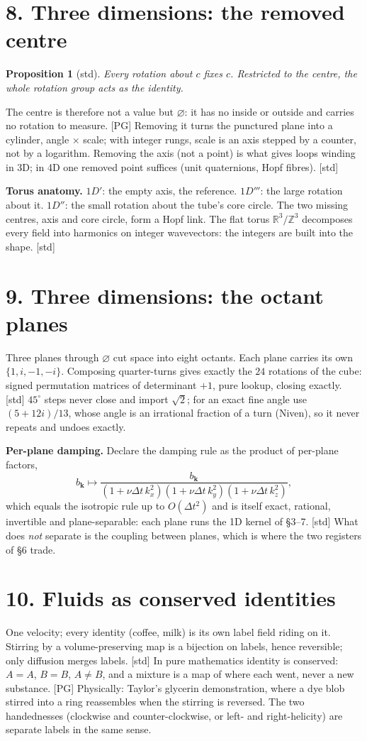\documentclass[11pt,a4paper]{article}
\newtheorem{prop}{Proposition}
\newcommand{\stamp}[1]{\textsf{\small[#1]}}
\newcommand{\E}{\varnothing}
\begin{document}
\section*{8. Three dimensions: the removed centre}
\begin{prop}[std]
Every rotation about $c$ fixes $c$. Restricted to the centre, the whole rotation group acts as the identity.
\end{prop}
The centre is therefore not a value but $\E$: it has no inside or outside and carries no rotation to measure. \stamp{PG} Removing it turns the punctured plane into a cylinder, angle $\times$ scale; with integer rungs, scale is an axis stepped by a counter, not by a logarithm. Removing the axis (not a point) is what gives loops winding in 3D; in 4D one removed point suffices (unit quaternions, Hopf fibres). \stamp{std}

\textbf{Torus anatomy.} $1D'$: the empty axis, the reference. $1D'''$: the large rotation about it. $1D''$: the small rotation about the tube's core circle. The two missing centres, axis and core circle, form a Hopf link. The flat torus $\mathbb R^3/\mathbb Z^3$ decomposes every field into harmonics on integer wavevectors: the integers are built into the shape. \stamp{std}

\section*{9. Three dimensions: the octant planes}
Three planes through $\E$ cut space into eight octants. Each plane carries its own $\{1,i,-1,-i\}$. Composing quarter-turns gives exactly the $24$ rotations of the cube: signed permutation matrices of determinant $+1$, pure lookup, closing exactly. \stamp{std} $45^\circ$ steps never close and import $\sqrt2$; for an exact fine angle use $(5+12i)/13$, whose angle is an irrational fraction of a turn (Niven), so it never repeats and undoes exactly.

\textbf{Per-plane damping.} Declare the damping rule as the product of per-plane factors,
\[
b_{\mathbf k}\mapsto\frac{b_{\mathbf k}}{(1+\nu\Delta t\,k_x^2)(1+\nu\Delta t\,k_y^2)(1+\nu\Delta t\,k_z^2)},
\]
which equals the isotropic rule up to $O(\Delta t^2)$ and is itself exact, rational, invertible and plane-separable: each plane runs the 1D kernel of \S3--7. \stamp{std} What does \emph{not} separate is the coupling between planes, which is where the two registers of \S6 trade.

\section*{10. Fluids as conserved identities}
One velocity; every identity (coffee, milk) is its own label field riding on it. Stirring by a volume-preserving map is a bijection on labels, hence reversible; only diffusion merges labels. \stamp{std} In pure mathematics identity is conserved: $A=A$, $B=B$, $A\ne B$, and a mixture is a map of where each went, never a new substance. \stamp{PG} Physically: Taylor's glycerin demonstration, where a dye blob stirred into a ring reassembles when the stirring is reversed. The two handednesses (clockwise and counter-clockwise, or left- and right-helicity) are separate labels in the same sense.
\end{document}
